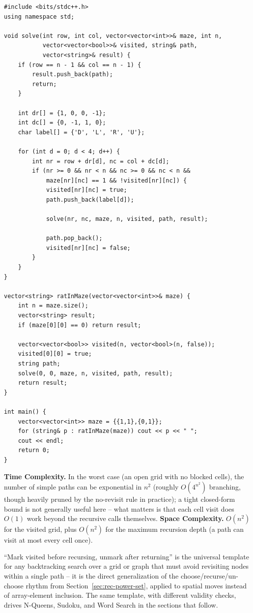 \begin{lstlisting}
#include <bits/stdc++.h>
using namespace std;

void solve(int row, int col, vector<vector<int>>& maze, int n,
           vector<vector<bool>>& visited, string& path,
           vector<string>& result) {
    if (row == n - 1 && col == n - 1) {
        result.push_back(path);
        return;
    }

    int dr[] = {1, 0, 0, -1};
    int dc[] = {0, -1, 1, 0};
    char label[] = {'D', 'L', 'R', 'U'};

    for (int d = 0; d < 4; d++) {
        int nr = row + dr[d], nc = col + dc[d];
        if (nr >= 0 && nr < n && nc >= 0 && nc < n &&
            maze[nr][nc] == 1 && !visited[nr][nc]) {
            visited[nr][nc] = true;
            path.push_back(label[d]);

            solve(nr, nc, maze, n, visited, path, result);

            path.pop_back();
            visited[nr][nc] = false;
        }
    }
}

vector<string> ratInMaze(vector<vector<int>>& maze) {
    int n = maze.size();
    vector<string> result;
    if (maze[0][0] == 0) return result;

    vector<vector<bool>> visited(n, vector<bool>(n, false));
    visited[0][0] = true;
    string path;
    solve(0, 0, maze, n, visited, path, result);
    return result;
}

int main() {
    vector<vector<int>> maze = {{1,1},{0,1}};
    for (string& p : ratInMaze(maze)) cout << p << " ";
    cout << endl;
    return 0;
}
\end{lstlisting}

\begin{complexitybox}
\textbf{Time Complexity.} In the worst case (an open grid with no
blocked cells), the number of simple paths can be exponential in $n^2$
(roughly $O(4^{n^2})$ branching, though heavily pruned by the
no-revisit rule in practice); a tight closed-form bound is not generally
useful here -- what matters is that each cell visit does $O(1)$ work
beyond the recursive calls themselves.
\textbf{Space Complexity.} $O(n^2)$ for the visited grid, plus
$O(n^2)$ for the maximum recursion depth (a path can visit at most every
cell once).
\end{complexitybox}

\begin{takeawaybox}
``Mark visited before recursing, unmark after returning'' is the
universal template for any backtracking search over a grid or graph that
must avoid revisiting nodes within a single path -- it is the direct
generalization of the choose/recurse/un-choose rhythm from
Section~\ref{sec:rec-power-set}, applied to spatial moves instead of
array-element inclusion. The same template, with different validity
checks, drives N-Queens, Sudoku, and Word Search in the sections that
follow.
\end{takeawaybox}
